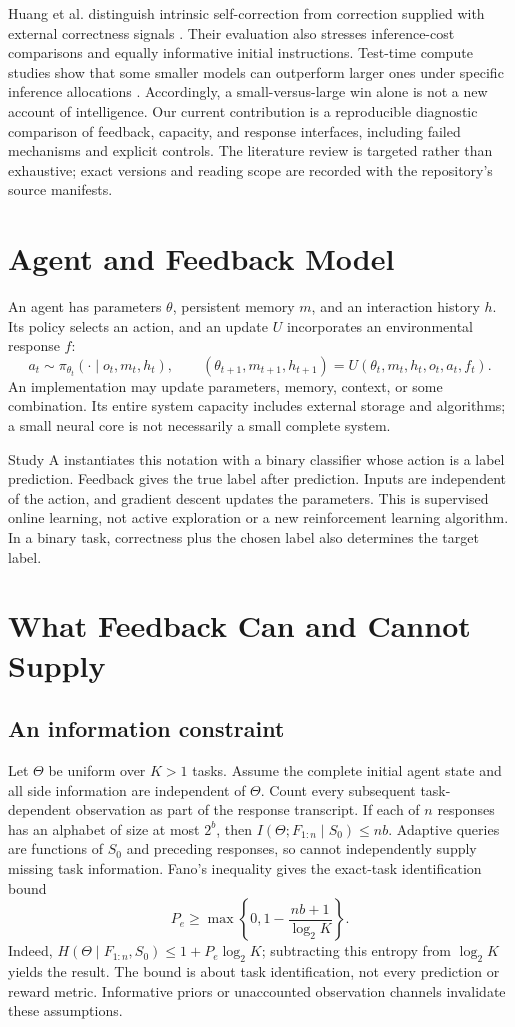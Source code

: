 \documentclass[11pt]{article}
\begin{document}
Huang et al. distinguish intrinsic self-correction from correction supplied
with external correctness signals \cite{huang}. Their evaluation also stresses
inference-cost comparisons and equally informative initial instructions.
Test-time compute studies show that some smaller models can outperform larger
ones under specific inference allocations \cite{snell}. Accordingly, a
small-versus-large win alone is not a new account of intelligence. Our current
contribution is a reproducible diagnostic comparison of feedback, capacity,
and response interfaces, including failed mechanisms and explicit controls.
The literature review is targeted rather than exhaustive; exact versions and
reading scope are recorded with the repository's source manifests.

\section{Agent and Feedback Model}
An agent has parameters $\theta$, persistent memory $m$, and an interaction
history $h$. Its policy selects an action, and an update $U$ incorporates an
environmental response $f$:
\[
 a_t\sim\pi_{\theta_t}(\cdot\mid o_t,m_t,h_t),\qquad
 (\theta_{t+1},m_{t+1},h_{t+1})=U(\theta_t,m_t,h_t,o_t,a_t,f_t).
\]
An implementation may update parameters, memory, context, or some combination.
Its entire system capacity includes external storage and algorithms; a small
neural core is not necessarily a small complete system.

Study A instantiates this notation with a binary classifier whose action is a
label prediction. Feedback gives the true label after prediction. Inputs are
independent of the action, and gradient descent updates the parameters. This
is supervised online learning, not active exploration or a new reinforcement
learning algorithm. In a binary task, correctness plus the chosen label also
determines the target label.

\section{What Feedback Can and Cannot Supply}
\subsection{An information constraint}
Let $\Theta$ be uniform over $K>1$ tasks. Assume the complete initial agent
state and all side information are independent of $\Theta$. Count every
subsequent task-dependent observation as part of the response transcript.
If each of $n$ responses has an alphabet of size at most $2^b$, then
$I(\Theta;F_{1:n}\mid S_0)\leq nb$. Adaptive queries are functions of
$S_0$ and preceding responses, so cannot independently supply missing task
information. Fano's inequality gives the exact-task identification bound
\[
 P_e\geq \max\left\{0,1-\frac{nb+1}{\log_2 K}\right\}.
\]
Indeed, $H(\Theta\mid F_{1:n},S_0)\leq 1+P_e\log_2 K$; subtracting
this entropy from $\log_2 K$ yields the result. The bound is about task
identification, not every prediction or reward metric. Informative priors or
unaccounted observation channels invalidate these assumptions.
\end{document}
